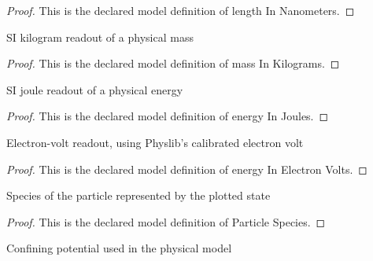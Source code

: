 \begin{proof}
  This is the declared model definition of length In Nanometers.
\end{proof}
\begin{definition}
  \label{def:physics:phyx-mini-0656:phyxminiproblems-problemphyxmini0656-massinkilograms}
  SI kilogram readout of a physical mass
\end{definition}
\begin{proof}
  This is the declared model definition of mass In Kilograms.
\end{proof}
\begin{definition}
  \label{def:physics:phyx-mini-0656:phyxminiproblems-problemphyxmini0656-energyinjoules}
  SI joule readout of a physical energy
\end{definition}
\begin{proof}
  This is the declared model definition of energy In Joules.
\end{proof}
\begin{definition}
  \label{def:physics:phyx-mini-0656:phyxminiproblems-problemphyxmini0656-energyinelectronvolts}
  Electron-volt readout, using Physlib's calibrated electron volt
\end{definition}
\begin{proof}
  This is the declared model definition of energy In Electron Volts.
\end{proof}
\begin{definition}
  \label{def:physics:phyx-mini-0656:phyxminiproblems-problemphyxmini0656-particlespecies}
  Species of the particle represented by the plotted state
\end{definition}
\begin{proof}
  This is the declared model definition of Particle Species.
\end{proof}
\begin{definition}
  \label{def:physics:phyx-mini-0656:phyxminiproblems-problemphyxmini0656-confinementmodel}
  Confining potential used in the physical model
\end{definition}

